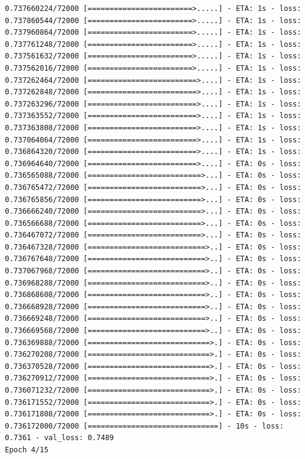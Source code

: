 \documentclass[12pt,fleqn]{article}\usepackage{../../common}
\begin{document}
\begin{verbatim}
0.737660224/72000 [========================>.....] - ETA: 1s - loss: 0.737860544/72000 [========================>.....] - ETA: 1s - loss: 0.737960864/72000 [========================>.....] - ETA: 1s - loss: 0.737761248/72000 [========================>.....] - ETA: 1s - loss: 0.737561632/72000 [========================>.....] - ETA: 1s - loss: 0.737562016/72000 [========================>.....] - ETA: 1s - loss: 0.737262464/72000 [=========================>....] - ETA: 1s - loss: 0.737262848/72000 [=========================>....] - ETA: 1s - loss: 0.737263296/72000 [=========================>....] - ETA: 1s - loss: 0.737363552/72000 [=========================>....] - ETA: 1s - loss: 0.737363808/72000 [=========================>....] - ETA: 1s - loss: 0.737064064/72000 [=========================>....] - ETA: 1s - loss: 0.736864320/72000 [=========================>....] - ETA: 1s - loss: 0.736964640/72000 [=========================>....] - ETA: 0s - loss: 0.736565088/72000 [==========================>...] - ETA: 0s - loss: 0.736765472/72000 [==========================>...] - ETA: 0s - loss: 0.736765856/72000 [==========================>...] - ETA: 0s - loss: 0.736666240/72000 [==========================>...] - ETA: 0s - loss: 0.736566688/72000 [==========================>...] - ETA: 0s - loss: 0.736467072/72000 [==========================>...] - ETA: 0s - loss: 0.736467328/72000 [===========================>..] - ETA: 0s - loss: 0.736767648/72000 [===========================>..] - ETA: 0s - loss: 0.737067968/72000 [===========================>..] - ETA: 0s - loss: 0.736968288/72000 [===========================>..] - ETA: 0s - loss: 0.736868608/72000 [===========================>..] - ETA: 0s - loss: 0.736668928/72000 [===========================>..] - ETA: 0s - loss: 0.736669248/72000 [===========================>..] - ETA: 0s - loss: 0.736669568/72000 [===========================>..] - ETA: 0s - loss: 0.736369888/72000 [============================>.] - ETA: 0s - loss: 0.736270208/72000 [============================>.] - ETA: 0s - loss: 0.736370528/72000 [============================>.] - ETA: 0s - loss: 0.736270912/72000 [============================>.] - ETA: 0s - loss: 0.736071232/72000 [============================>.] - ETA: 0s - loss: 0.736171552/72000 [============================>.] - ETA: 0s - loss: 0.736171808/72000 [============================>.] - ETA: 0s - loss: 0.736172000/72000 [==============================] - 10s - loss: 0.7361 - val_loss: 0.7489
Epoch 4/15

\end{verbatim}
\end{document}
